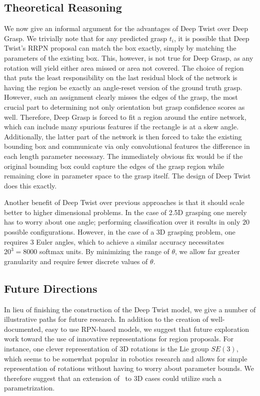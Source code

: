 \documentclass[10pt,twocolumn,letterpaper]{article}
\begin{document}
\subsection*{Theoretical Reasoning}

We now give an informal argument for the advantages of Deep Twist over Deep Grasp. We trivially note that for any predicted grasp $t_i$, it is possible that Deep Twist's RRPN proposal can match the box exactly, simply by matching the parameters of the existing box. This, however, is not true for Deep Grasp, as any rotation will yield either area missed or area not covered. The choice of region that puts the least responsibility on the last residual block of the network is having the region be exactly an angle-reset version of the ground truth grasp. However, such an assignment clearly misses the edges of the grasp, the most crucial part to determining not only orientation but grasp confidence scores as well. Therefore, Deep Grasp is forced to fit a region around the entire network, which can include many spurious features if the rectangle is at a skew angle. Additionally, the latter part of the network is then forced to take the existing bounding box and communicate via only convolutional features the difference in each length parameter necessary. The immediately obvious fix would be if the original bounding box could capture the edges of the grasp region while remaining close in parameter space to the grasp itself. The design of Deep Twist does this exactly.

Another benefit of Deep Twist over previous approaches is that it should scale better to higher dimensional problems. In the case of 2.5D grasping one merely has to worry about one angle; performing classification over it results in only $20$ possible configurations. However, in the case of a 3D grasping problem, one requires 3 Euler angles, which to achieve a similar accuracy necessitates $20^3 = 8000$ softmax units. By minimizing the range of $\theta$, we allow far greater granularity and require fewer discrete values of $\theta$.

\subsection*{Future Directions}

In lieu of finishing the construction of the Deep Twist model, we give a number of illustrative paths for future research. In addition to the creation of well-documented, easy to use RPN-based models, we suggest that future exploration work toward the use of innovative representations for region proposals. For instance, one clever representation of 3D rotations is the Lie group $SE(3)$, which seems to be somewhat popular in robotics research \cite{liegroups} and allows for simple representation of rotations without having to worry about parameter bounds. We therefore suggest that an extension of~\cite{ma18} to 3D cases could utilize such a parametrization. 
\end{document}
